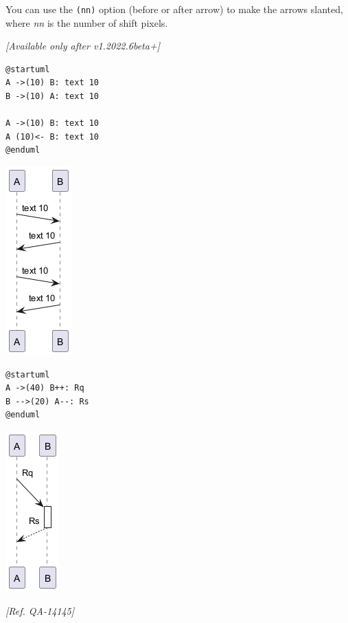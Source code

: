 You can use the \texttt{(nn)} option (before or after arrow) to make the arrows slanted, where \textit{nn} is the number of shift pixels.


\textit{[Available only after v1.2022.6beta+]}


\begin{verbatim}
@startuml
A ->(10) B: text 10
B ->(10) A: text 10

A ->(10) B: text 10
A (10)<- B: text 10
@enduml
\end{verbatim}
\begin{center}
\includegraphics[scale=0.60]{imgw/img-89644ab82cec13c65ff82e91309d4bf5.png}
\end{center}


\begin{verbatim}
@startuml
A ->(40) B++: Rq
B -->(20) A--: Rs
@enduml
\end{verbatim}
\begin{center}
\includegraphics[scale=0.60]{imgw/img-d47da36df96c90f3d60a47954c47f642.png}
\end{center}
\textit{[Ref. QA-14145]}


